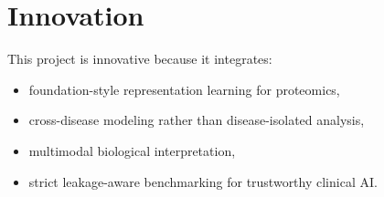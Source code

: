 \section{Innovation}

This project is innovative because it integrates:
\begin{itemize}
  \item foundation-style representation learning for proteomics,
  \item cross-disease modeling rather than disease-isolated analysis,
  \item multimodal biological interpretation,
  \item strict leakage-aware benchmarking for trustworthy clinical AI.
\end{itemize}
